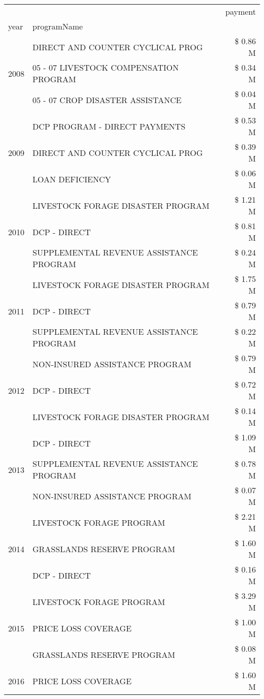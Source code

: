 \begin{tabular}{llr}
\toprule
 &  & payment \\
year & programName &  \\
\midrule
\multirow[t]{3}{*}{2008} & DIRECT AND COUNTER CYCLICAL PROG & \$ 0.86 M \\
 & 05 - 07 LIVESTOCK COMPENSATION PROGRAM & \$ 0.34 M \\
 & 05 - 07 CROP DISASTER ASSISTANCE & \$ 0.04 M \\
\cline{1-3}
\multirow[t]{3}{*}{2009} & DCP PROGRAM - DIRECT PAYMENTS & \$ 0.53 M \\
 & DIRECT AND COUNTER CYCLICAL PROG & \$ 0.39 M \\
 & LOAN DEFICIENCY & \$ 0.06 M \\
\cline{1-3}
\multirow[t]{3}{*}{2010} & LIVESTOCK FORAGE DISASTER PROGRAM & \$ 1.21 M \\
 & DCP - DIRECT & \$ 0.81 M \\
 & SUPPLEMENTAL REVENUE ASSISTANCE PROGRAM & \$ 0.24 M \\
\cline{1-3}
\multirow[t]{3}{*}{2011} & LIVESTOCK FORAGE DISASTER PROGRAM & \$ 1.75 M \\
 & DCP - DIRECT & \$ 0.79 M \\
 & SUPPLEMENTAL REVENUE ASSISTANCE PROGRAM & \$ 0.22 M \\
\cline{1-3}
\multirow[t]{3}{*}{2012} & NON-INSURED ASSISTANCE PROGRAM & \$ 0.79 M \\
 & DCP - DIRECT & \$ 0.72 M \\
 & LIVESTOCK FORAGE DISASTER PROGRAM & \$ 0.14 M \\
\cline{1-3}
\multirow[t]{3}{*}{2013} & DCP - DIRECT & \$ 1.09 M \\
 & SUPPLEMENTAL REVENUE ASSISTANCE PROGRAM & \$ 0.78 M \\
 & NON-INSURED ASSISTANCE PROGRAM & \$ 0.07 M \\
\cline{1-3}
\multirow[t]{3}{*}{2014} & LIVESTOCK FORAGE PROGRAM & \$ 2.21 M \\
 & GRASSLANDS RESERVE PROGRAM & \$ 1.60 M \\
 & DCP - DIRECT & \$ 0.16 M \\
\cline{1-3}
\multirow[t]{3}{*}{2015} & LIVESTOCK FORAGE PROGRAM & \$ 3.29 M \\
 & PRICE LOSS COVERAGE & \$ 1.00 M \\
 & GRASSLANDS RESERVE PROGRAM & \$ 0.08 M \\
\cline{1-3}
\multirow[t]{3}{*}{2016} & PRICE LOSS COVERAGE & \$ 1.60 M \\

\end{tabular}
